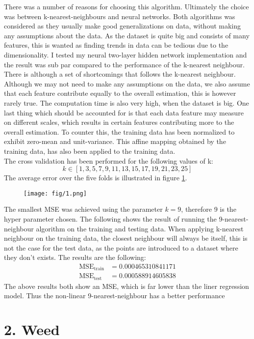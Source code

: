 \documentclass{article}
\begin{document}
There was a number of reasons for choosing this algorithm. Ultimately the choice was between k-nearest-neighbours and neural networks. Both algorithms was considered as they usually make good generalizations on data, without making any assumptions about the data. As the dataset is quite big and consists of many features, this is wanted as finding trends in data can be tedious due to the dimensionality. I tested my neural two-layer hidden network implementation and the result was sub par compared to the performance of  the k-nearest neighbour. There is although a set of shortcomings that follows the k-nearest neighbour. Although we may not need to make any assumptions on the data, we also assume that each feature contribute equally to the overall estimation, this is however rarely true. The computation time is also very high, when the dataset is big. One last thing which should be accounted for is that each data feature may measure on different scales, which results in certain features contributing more to the overall estimation. To counter this, the training data has been normalized to exhibit zero-mean and unit-variance. This affine mapping obtained by the training data, has also been applied to the training data. \\
The cross validation has been performed for the following values of k:
$$ k \in \left[ 1,3,5,7,9,11,13,15,17,19,21,23,25 \right] $$
The average error over the five folds is illustrated in figure \ref{fig:mulplots}.
\begin{figure}[H]
  \centering
  \texttt{[image: fig/1.png]}
  \caption{}
  \label{fig:mulplots}
\end{figure}
The smallest MSE was achieved using the parameter $k=9$, therefore 9 is the hyper parameter chosen. The following shows the result of running the 9-nearest-neighbour algorithm on the training and testing data. When applying k-nearest neighbour on the training data, the closest neighbour will always be itself, this is not the case for the test data, as the points are introduced to a dataset where they don't exists. The results are the following:
\begin{align*}
\text{MSE}_{\text{train}} &=  0.000465310841171 \\
\text{MSE}_{\text{test}} &=  0.000588914605838
\end{align*}
The above results both show an MSE, which is far lower than the liner regression model. Thus the non-linear 9-nearest-neighbour has a better performance %
\section{2. Weed}
\end{document}
